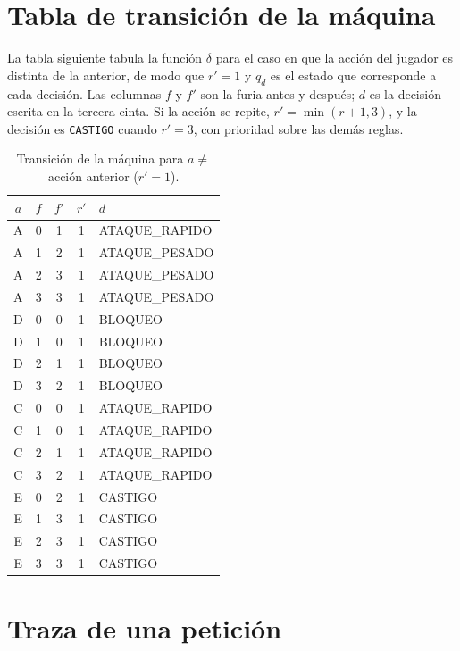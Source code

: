 \section{Tabla de transición de la máquina}
\label{app:delta}

La tabla siguiente tabula la función $\delta$ para el caso en que la acción del jugador es distinta de la anterior, de modo que $r'=1$ y $q_d$ es el estado que corresponde a cada decisión. Las columnas $f$ y $f'$ son la furia antes y después; $d$ es la decisión escrita en la tercera cinta. Si la acción se repite, $r'=\min(r+1,3)$, y la decisión es \texttt{CASTIGO} cuando $r'=3$, con prioridad sobre las demás reglas.

\begin{table}[t]
\centering
\caption{Transición de la máquina para $a\neq$ acción anterior ($r'=1$).}
\label{tab:delta}
\setlength{\tabcolsep}{4pt}
\begin{tabular}{c c c c l}
\toprule
\textbf{$a$} & \textbf{$f$} & \textbf{$f'$} & \textbf{$r'$} & \textbf{$d$} \\
\midrule
A & 0 & 1 & 1 & ATAQUE\_RAPIDO \\
A & 1 & 2 & 1 & ATAQUE\_PESADO \\
A & 2 & 3 & 1 & ATAQUE\_PESADO \\
A & 3 & 3 & 1 & ATAQUE\_PESADO \\
\midrule
D & 0 & 0 & 1 & BLOQUEO \\
D & 1 & 0 & 1 & BLOQUEO \\
D & 2 & 1 & 1 & BLOQUEO \\
D & 3 & 2 & 1 & BLOQUEO \\
\midrule
C & 0 & 0 & 1 & ATAQUE\_RAPIDO \\
C & 1 & 0 & 1 & ATAQUE\_RAPIDO \\
C & 2 & 1 & 1 & ATAQUE\_RAPIDO \\
C & 3 & 2 & 1 & ATAQUE\_RAPIDO \\
\midrule
E & 0 & 2 & 1 & CASTIGO \\
E & 1 & 3 & 1 & CASTIGO \\
E & 2 & 3 & 1 & CASTIGO \\
E & 3 & 3 & 1 & CASTIGO \\
\bottomrule
\end{tabular}
\end{table}

\section{Traza de una petición}
\label{app:traza}


